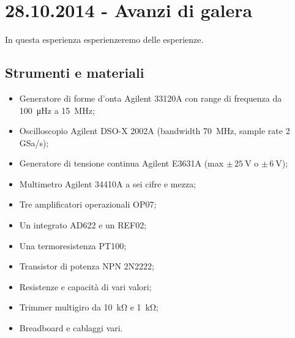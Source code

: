 \section{28.10.2014 - Avanzi di galera}

In questa esperienza esperienzeremo delle esperienze.

\subsection*{Strumenti e materiali}

\begin{itemize} [noitemsep]
	\item Generatore di forme d'onta Agilent 33120A con range di frequenza da \SI{100}{\micro\hertz} a \SI{15}{\mega\hertz};
	\item Oscilloscopio Agilent DSO-X 2002A (bandwidth \SI{70}{\mega\hertz}, sample rate \num{2} GSa/s);%
		\item Generatore di tensione continua Agilent E3631A (max $\pm \, \SI{25}{\volt}$ o $\pm \, \SI{6}{\volt}$);
		\item Multimetro Agilent 34410A a sei cifre e mezza;
		\item Tre amplificatori operazionali OP07;
		\item Un integrato AD622 e un REF02;
		\item Una termoresistenza PT100;
		\item Transistor di potenza NPN 2N2222;
		\item Resistenze e capacità di vari valori;
		\item Trimmer multigiro da \SI{10}{\kilo\ohm} e \SI{1}{\kilo\ohm};
		\item Breadboard e cablaggi vari.
\end{itemize}
